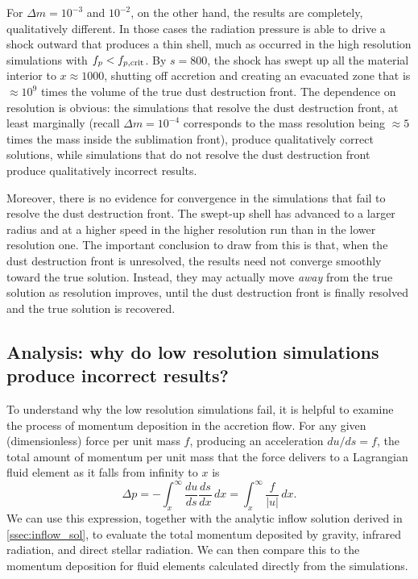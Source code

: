 \documentclass[useAMS,usenatbib]{mn2e}
\begin{document}
For $\Delta m = 10^{-3}$ and $10^{-2}$, on the other hand, the results are completely, qualitatively different. In those cases the radiation pressure is able to drive a shock outward that produces a thin shell, much as occurred in the high resolution simulations with $f_p < f_{p,\rm crit}$. By $s=800$, the shock has swept up all the material interior to $x\approx 1000$, shutting off accretion and creating an evacuated zone that is $\approx 10^9$ times the volume of the true dust destruction front. The dependence on resolution is obvious: the simulations that resolve the dust destruction front, at least marginally (recall $\Delta m = 10^{-4}$ corresponds to the mass resolution being $\approx 5$ times the mass inside the sublimation front), produce qualitatively correct solutions, while simulations that do not resolve the dust destruction front produce qualitatively incorrect results.

Moreover, there is no evidence for convergence in the simulations that fail to resolve the dust destruction front. The swept-up shell has advanced to a larger radius and at a higher speed in the higher resolution run than in the lower resolution one. The important conclusion to draw from this is that, when the dust destruction front is unresolved, the results need not converge smoothly toward the true solution. Instead, they may actually move \textit{away} from the true solution as resolution improves, until the dust destruction front is finally resolved and the true solution is recovered.

\subsection{Analysis: why do low resolution simulations produce incorrect results?}
\label{ssec:analysis}

To understand why the low resolution simulations fail, it is helpful to examine the process of momentum deposition in the accretion flow. For any given (dimensionless) force per unit mass $f$, producing an acceleration $du/ds = f$, the total amount of momentum per unit mass that the force delivers to a Lagrangian fluid element as it falls from infinity to $x$ is
\begin{equation}
\Delta p = -\int_x^\infty \frac{du}{ds} \frac{ds}{dx} \, dx = \int_x^{\infty} \frac{f}{|u|} \, dx.
\end{equation}
We can use this expression, together with the analytic inflow solution derived in \autoref{ssec:inflow_sol}, to evaluate the total momentum deposited by gravity, infrared radiation, and direct stellar radiation. We can then compare this to the momentum deposition for fluid elements calculated directly from the simulations.
\end{document}
